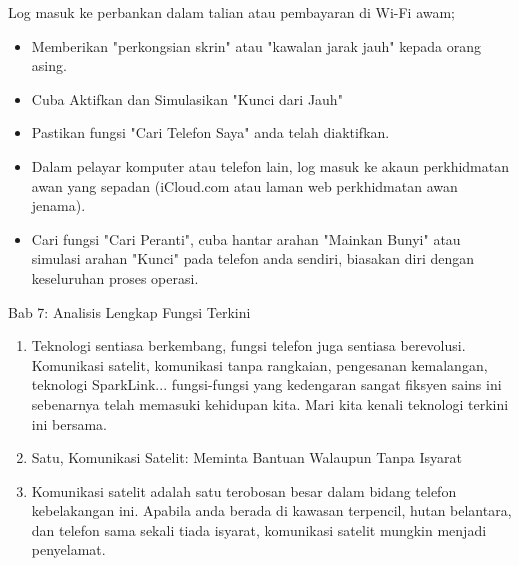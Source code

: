 \begin{tcbwarn}{Log masuk ke perbankan dalam talian atau pembayaran di Wi-Fi awam;}
\begin{itemize}
  \item Memberikan "perkongsian skrin" atau "kawalan jarak jauh" kepada orang asing.
  \item Cuba Aktifkan dan Simulasikan "Kunci dari Jauh"
  \item Pastikan fungsi "Cari Telefon Saya" anda telah diaktifkan.
  \item Dalam pelayar komputer atau telefon lain, log masuk ke akaun perkhidmatan awan yang sepadan (iCloud.com atau laman web perkhidmatan awan jenama).
  \item Cari fungsi "Cari Peranti", cuba hantar arahan "Mainkan Bunyi" atau simulasi arahan "Kunci" pada telefon anda sendiri, biasakan diri dengan keseluruhan proses operasi.
\end{itemize}

\end{tcbwarn}

\begin{tcbpractice}{Bab 7: Analisis Lengkap Fungsi Terkini}
\begin{enumerate}
  \item Teknologi sentiasa berkembang, fungsi telefon juga sentiasa berevolusi. Komunikasi satelit, komunikasi tanpa rangkaian, pengesanan kemalangan, teknologi SparkLink... fungsi-fungsi yang kedengaran sangat fiksyen sains ini sebenarnya telah memasuki kehidupan kita. Mari kita kenali teknologi terkini ini bersama.
  \item Satu, Komunikasi Satelit: Meminta Bantuan Walaupun Tanpa Isyarat
  \item Komunikasi satelit adalah satu terobosan besar dalam bidang telefon kebelakangan ini. Apabila anda berada di kawasan terpencil, hutan belantara, dan telefon sama sekali tiada isyarat, komunikasi satelit mungkin menjadi penyelamat.
\end{enumerate}

\end{tcbpractice}
